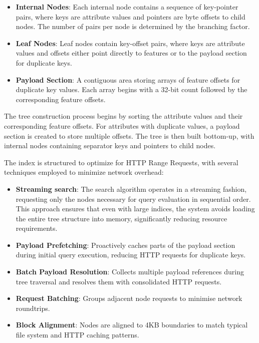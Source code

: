 \begin{itemize}
    \item \textbf{Internal Nodes}: Each internal node contains a sequence of key-pointer pairs, where keys are attribute values and pointers are byte offsets to child nodes. The number of pairs per node is determined by the branching factor.

    \item \textbf{Leaf Nodes}: Leaf nodes contain key-offset pairs, where keys are attribute values and offsets either point directly to features or to the payload section for duplicate keys.

    \item \textbf{Payload Section}: A contiguous area storing arrays of feature offsets for duplicate key values. Each array begins with a 32-bit count followed by the corresponding feature offsets.
\end{itemize}

The tree construction process begins by sorting the attribute values and their corresponding feature offsets. For attributes with duplicate values, a payload section is created to store multiple offsets. The tree is then built bottom-up, with internal nodes containing separator keys and pointers to child nodes.

The index is structured to optimize for HTTP Range Requests, with several techniques employed to minimize network overhead:

\begin{itemize}
    \item \textbf{Streaming search}: The search algorithm operates in a streaming fashion, requesting only the nodes necessary for query evaluation in sequential order. This approach ensures that even with large indices, the system avoids loading the entire tree structure into memory, significantly reducing resource requirements.
    \item \textbf{Payload Prefetching}: Proactively caches parts of the payload section during initial query execution, reducing HTTP requests for duplicate keys.
    \item \textbf{Batch Payload Resolution}: Collects multiple payload references during tree traversal and resolves them with consolidated HTTP requests.
    \item \textbf{Request Batching}: Groups adjacent node requests to minimise network roundtrips.
    \item \textbf{Block Alignment}: Nodes are aligned to 4KB boundaries to match typical file system and HTTP caching patterns.
\end{itemize}

